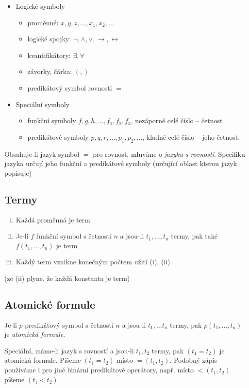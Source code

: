 \documentclass[a4paper, 11pt]{report}
\begin{document}
\begin{itemize}
	\item Logické symboly
	\begin{itemize}
		\item proměnné: $x, y, z, \dots, x_1, x_2, \dots$
		\item logické spojky: $ \lnot, \land, \lor, \to, \leftrightarrow$
		\item kvantifikátory: $\exists, \forall$
		\item závorky, čárka: $(,)$
		\item predikátový symbol rovnosti $=$
	\end{itemize}
	\item Speciální symboly
	\begin{itemize}
		\item funkční symboly $f, g, h, \dots, f_1, f_2, f_3$, nezáporné celé číslo -- četnost
		\item predikátové symboly $p, q, r, \dots, p_1, p_2, \dots$, kladné celé číslo -- jeho četnost.
	\end{itemize}
\end{itemize}

Obsahuje-li jazyk symbol $=$ pro rovnost, mluvíme o \emph{jazyku s rovností}.
Specifiku jazyka určují jeho funkční a predikátové symboly (určující oblast kterou jazyk popisuje)

\subsection{Termy}
\begin{enumerate}[(i)]
	\item Každá proměnná je term
	\item Je-li $f$ funkční symbol s četností $n$ a jsou-li $t_1, \dots, t_n$ termy, pak také $f(t_1, \dots, t_n)$ je term
	\item Každý term vznikne konečným počtem užití (i), (ii)
\end{enumerate}
(ze (ii) plyne, že každá konstanta je term)

\subsection{Atomické formule}
Je-li $p$ predikátový symbol s četností $n$ a jsou-li $t_1, \dots t_n$ termy, pak $p(t_1, \dots, t_n)$ je \emph{atomická formule}.

Speciální, máme-li jazyk s rovností a jsou-li $t_1, t_2$ termy, pak $(t_1 = t_2)$ je atomická formule.
Píšeme $(t_1 = t_2)$ místo $=(t_1, t_2)$. Podobný zápis používáme i pro jiné binární predikátové operátory, např. místo $< (t_1, t_2)$ píšeme $(t_1 < t_2)$.
\end{document}
